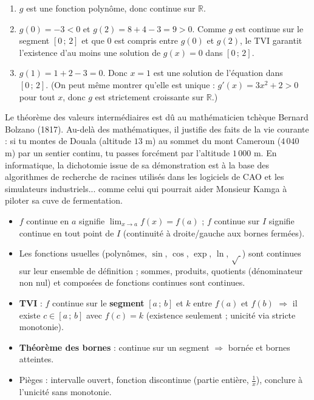 \documentclass[11pt]{article}
\begin{document}
\begin{corrige}[Exercice]
\begin{enumerate}
\item $g$ est une fonction polynôme, donc continue sur $\mathbb{R}$.
\item $g(0) = -3 < 0$ et $g(2) = 8 + 4 - 3 = 9 > 0$. Comme $g$ est continue sur le segment $[0\,;\,2]$ et que $0$ est compris entre $g(0)$ et $g(2)$, le TVI garantit l'existence d'au moins une solution de $g(x) = 0$ dans $[0\,;\,2]$.
\item $g(1) = 1 + 2 - 3 = 0$. Donc $x = 1$ est une solution de l'équation dans $[0\,;\,2]$. (On peut même montrer qu'elle est unique : $g'(x) = 3x^2 + 2 > 0$ pour tout $x$, donc $g$ est strictement croissante sur $\mathbb{R}$.)
\end{enumerate}
\end{corrige}

\begin{savaistu}
Le théorème des valeurs intermédiaires est dû au mathématicien tchèque Bernard Bolzano (1817). Au-delà des mathématiques, il justifie des faits de la vie courante : si tu montes de Douala (altitude $13$ m) au sommet du mont Cameroun ($4\,040$ m) par un sentier continu, tu passes forcément par l'altitude $1\,000$ m. En informatique, la dichotomie issue de sa démonstration est à la base des algorithmes de recherche de racines utilisés dans les logiciels de CAO et les simulateurs industriels... comme celui qui pourrait aider Monsieur Kamga à piloter sa cuve de fermentation.
\end{savaistu}

\begin{aretenir}
\begin{itemize}
\item $f$ continue en $a$ signifie $\lim_{x \to a} f(x) = f(a)$ ; $f$ continue sur $I$ signifie continue en tout point de $I$ (continuité à droite/gauche aux bornes fermées).
\item Les fonctions usuelles (polynômes, $\sin$, $\cos$, $\exp$, $\ln$, $\sqrt{\ }$) sont continues sur leur ensemble de définition ; sommes, produits, quotients (dénominateur non nul) et composées de fonctions continues sont continues.
\item \textbf{TVI} : $f$ continue sur le \textbf{segment} $[a\,;\,b]$ et $k$ entre $f(a)$ et $f(b)$ $\Rightarrow$ il existe $c \in [a\,;\,b]$ avec $f(c) = k$ (existence seulement ; unicité via stricte monotonie).
\item \textbf{Théorème des bornes} : continue sur un segment $\Rightarrow$ bornée et bornes atteintes.
\item Pièges : intervalle ouvert, fonction discontinue (partie entière, $\frac{1}{x}$), conclure à l'unicité sans monotonie.
\end{itemize}
\end{aretenir}
\end{document}
